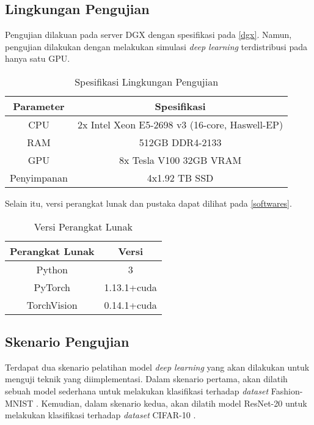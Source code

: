 \subsection{Lingkungan Pengujian}
Pengujian dilakuan pada server DGX dengan spesifikasi pada \autoref{dgx}. Namun, pengujian dilakukan dengan melakukan simulasi \emph{deep learning} terdistribusi pada hanya satu GPU.

\begin{table}[H]
  \caption{Spesifikasi Lingkungan Pengujian}\label{dgx}
  \centering
  \begin{tabular}{ | c | c | }
    \hline
    \textbf{Parameter} & \textbf{Spesifikasi}                           \\
    \hline
    CPU                & 2x Intel Xeon E5-2698 v3 (16-core, Haswell-EP) \\
    \hline
    RAM                & 512GB DDR4-2133                                \\
    \hline
    GPU                & 8x Tesla V100 32GB VRAM                        \\
    \hline
    Penyimpanan        & 4x1.92 TB SSD                                  \\
    \hline
  \end{tabular}
\end{table}

Selain itu, versi perangkat lunak dan pustaka dapat dilihat pada \autoref{softwares}.
\begin{table}[H]
  \caption{Versi Perangkat Lunak}\label{softwares}
  \centering
  \begin{tabular}{ | c | c | }
    \hline
    \textbf{Perangkat Lunak} & \textbf{Versi} \\
    \hline
    Python                   & 3              \\
    \hline
    PyTorch                  & 1.13.1+cuda    \\
    \hline
    TorchVision              & 0.14.1+cuda    \\
    \hline
  \end{tabular}
\end{table}

\subsection{Skenario Pengujian}
Terdapat dua skenario pelatihan model \emph{deep learning} yang akan dilakukan untuk menguji teknik yang diimplementasi. Dalam skenario pertama, akan dilatih sebuah model sederhana untuk melakukan klasifikasi terhadap \emph{dataset} Fashion-MNIST \parencite{xiao2017fashion}. Kemudian, dalam skenario kedua, akan dilatih model ResNet-20 \parencite{he2015deep} untuk melakukan klasifikasi terhadap \emph{dataset} CIFAR-10 \parencite{krizhevsky2009cifar}.


